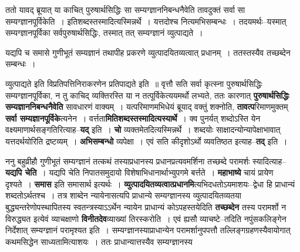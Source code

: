 \documentclass[article,12pt,a4paper]{memoir}
\begin{document}
	ततो यावद् ब्रूयात् या काचित् पुरुषार्थसिद्धिः सा सम्यग्ज्ञाननिबन्धनैवेति तावदुक्तं सर्वा सा सम्यग्ज्ञानपूर्विकेति । इतिशब्दस्तस्मादित्यस्मिन्नर्थे । यत्तदोश्च नित्यमभिसम्बन्धः । तदयमर्थः--यस्मात् सम्यग्ज्ञानपूर्विका सर्वपुरुषार्थसिद्धिः, तस्मात् तत् सम्यग्ज्ञानं व्युत्पाद्यते ।  
	  
	यद्यपि च समासे गुणीभूतं सम्यज्ञानं तथापीह प्रकरणे व्युत्पादयितव्यत्वात् प्रधानम् । ततस्तस्यैव तच्छब्देन सम्बन्धः ।  
	  
	व्युत्पाद्यते इति विप्रतिपत्तिनिराकरणेन प्रतिपाद्यते इति ॥ वृत्तौ सति सर्वा कृत्स्ना पुरुषार्थसिद्धिः सम्यग्ज्ञानपूर्विका, न तु काचिद् व्यक्तिरस्ति या न तत्पूर्विकेत्ययमर्थो लभ्यते, ततः कारणात् \textbf{पुरुषार्थसिद्धिः सम्यज्ञाननिबन्धनैवेति} सावधारणं वाक्यम् । यत्परिमाणमभिधेयं ब्रूयाद् वक्तुं शक्नोति, \textbf{तावत्प}रिमाणमुक्तम् \textbf{सर्वा सम्यज्ञानपूर्विके}त्यनेन । वर्त्तता\textbf{मितिशब्दस्तस्मादित्यस्यार्थे} । क्व पुनर्यत् शब्दोऽस्ति येन वक्ष्यमाणार्थसङ्गतिरित्याह--\textbf{यद्} इति । \textbf{चो} \leavevmode{} व्यक्तमेतदित्यस्मिन्नर्थे । शब्दयोः साक्षादन्योन्यापेक्षाभावात् यत्तदर्थयोरिति द्रष्टव्यम् । \textbf{अभिसम्बन्धो} व्यपेक्षा । एवं सति कीदृशोऽर्थो व्यवतिष्ठत इत्याह--\textbf{तद्} इति ।
	\pend
      

	  \pstart ननु बहुव्रीहौ गुणीभूतं सम्यग्ज्ञानं तत्कथं तस्याप्रधानस्य प्रधानप्रत्यवमर्शिना तच्छब्दे परामर्शः स्यादित्याह--\textbf{यद्यपि चेति} । यद्यपि चेति निपातसमुदायो विशेषाभिधानार्थाभ्युपगमे बर्त्तते । \textbf{महाभाष्ये} चायं प्रायेण दृश्यते । \textbf{समास} इति समासार्थ इत्यर्थः । \textbf{व्युत्पादयितव्यत्वात्प्रधानमि}त्यभिदधतोऽयमाशयः--द्वेधा हि प्राधान्यं शब्दतोऽर्थतश्च । तत्र शाब्देन न्यायेनासत्यपि प्राधान्ये सम्यग्ज्ञानस्य व्युत्पादयितव्यतया बुद्ध्यन्तरेणोपस्थापितस्य स्वतन्त्रस्याऽऽर्थेन न्यायेन प्राधान्यं कोऽपहस्तयेदिति \textbf{तच्छब्देन} तस्य परामर्शो न विरुद्ध्यत इत्येवं व्याचक्षाणो \textbf{विनीतदेव}व्याख्यां तिरस्करोति । एवं ह्यसौ व्याचष्टे--तदिति नपुंसकलिङ्गेन निर्देशात् सम्यग्ज्ञानं परामृश्यत इति । सम्यग्ज्ञानस्याप्राधान्येन परामर्शानुपपत्तौ तल्लिङ्गग्रहणस्यैवायोगात् कथमसिद्धेन साध्यतामित्याशयः । ततः प्राधान्यात्तस्यैव सम्यग्ज्ञानस्य  \leavevmode{} 
	  
\end{document}
